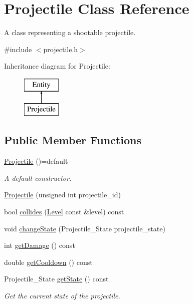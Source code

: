 \hypertarget{classProjectile}{}\section{Projectile Class Reference}
\label{classProjectile}


A class representing a shootable projectile.  




{\ttfamily \#include $<$projectile.\+h$>$}

Inheritance diagram for Projectile\+:\begin{figure}[H]
\begin{center}
\leavevmode
\includegraphics[height=2.000000cm]{classProjectile}
\end{center}
\end{figure}
\subsection*{Public Member Functions}
\begin{DoxyCompactItemize}
\item 
\hyperlink{classProjectile_af8b4c110af08163aeca99610e3906311}{Projectile} ()=default
\begin{DoxyCompactList}\small\item\em A default constructor. \end{DoxyCompactList}\item 
\hyperlink{classProjectile_a7b321cb748e1c2fbe83a44d4f9ec2576}{Projectile} (unsigned int projectile\+\_\+id)
\item 
bool \hyperlink{classProjectile_a54f456e92b08f461ae7410da49757f3f}{collides} (\hyperlink{classLevel}{Level} const \&level) const
\item 
void \hyperlink{classProjectile_a0ecfd73e9c4fe504f635d9b318cd241a}{change\+State} (Projectile\+\_\+\+State projectile\+\_\+state)
\item 
int \hyperlink{classProjectile_af5cd30772ad4cb3894629ca76c6b8f79}{get\+Damage} () const
\item 
double \hyperlink{classProjectile_a845770fb2b5806e1729e4bbda85849f7}{get\+Cooldown} () const
\item 
Projectile\+\_\+\+State \hyperlink{classProjectile_aa864e84b8777bed6114ef09da0c9bdad}{get\+State} () const
\begin{DoxyCompactList}\small\item\em Get the current state of the projectile. \end{DoxyCompactList}\end{DoxyCompactItemize}
